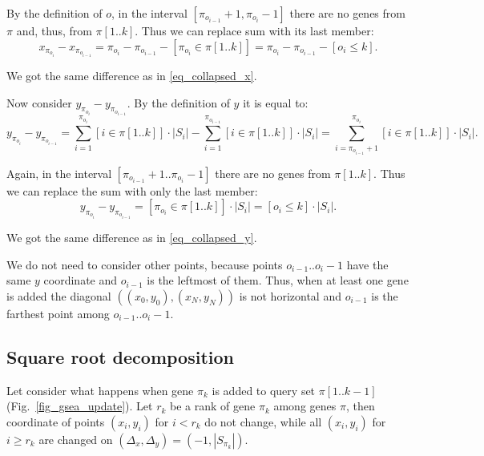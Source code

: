 \documentclass[runningheads,a4paper]{llncs}
\begin{document}
By the definition of $o$, in the interval 
$[\pi_{o_{i-1}} + 1, \pi_{o_{i}} -1]$ there are no genes from $\pi$ and,
thus, from $\pi[1..k]$. Thus we can replace sum with its last member:
\[
    x_{\pi_{o_i}} - x_{\pi_{o_{i-1}}} = 
        \pi_{o_i} - \pi_{o_{i-1}} - [\pi_{o_i} \in \pi [1..k]] = 
        \pi_{o_i} - \pi_{o_{i-1}} - [o_i \le k].
\]

We got the same difference as in \eqref{eq_collapsed_x}.

Now consider $y_{\pi_{o_i}} - y_{\pi_{o_{i-1}}}$. By the definition of $y$ 
it is equal to:
\[
    y_{\pi_{o_i}} - y_{\pi_{o_{i-1}}} = 
        \sum_{i=1}^{\pi_{o_i}} [i \in \pi [1..k]] \cdot |S_i| - 
        \sum_{i=1}^{\pi_{o_{i-1}}} [i \in \pi [1..k]] \cdot |S_i| =  
        \sum_{i=\pi_{o_{i-1}} + 1}^{\pi_{o_i}} [i \in \pi [1..k]] \cdot |S_i|.
\]

Again, in the interval $[\pi_{o_{i-1}} + 1..\pi_{o_{i}} -1]$ 
there are no genes from $\pi[1..k]$. Thus we can replace the sum with only the
last member:
\[
    y_{\pi_{o_i}} - y_{\pi_{o_{i-1}}} = 
        [\pi_{o_i} \in \pi [1..k]] \cdot |S_i| = 
        [o_i \le k] \cdot |S_i|.
\]

We got the same difference as in \eqref{eq_collapsed_y}.

We do not need to consider other points, because points 
$o_{i-1}..o_i-1$ have the same $y$ coordinate
and $o_{i-1}$ is the leftmost of them. Thus, when at 
least one gene is added the diagonal 
$\left((x_0, y_0), (x_N, y_N)\right)$ is not horizontal and
$o_{i-1}$ is the farthest point among $o_{i-1}..o_i-1$.


\subsection{Square root decomposition}


Let consider what happens when gene $\pi_k$ is added to query set $\pi[1..k-1]$ 
(Fig.~\ref{fig_gsea_update}).
Let $r_k$ be a rank of gene $\pi_k$ among genes $\pi$,
then 
coordinate of points $(x_i, y_i)$ for $i < r_k$ 
do not change, while all $(x_i, y_i)$ for $i \ge r_k$ are changed on
$(\Delta_x,\Delta_y) = (-1, |S_{\pi_k}|)$.
\end{document}
